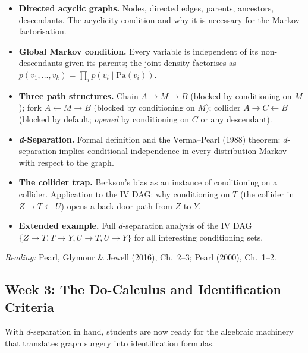 \documentclass[12pt]{article}
\begin{document}
\begin{itemize}
  \item \textbf{Directed acyclic graphs.}
    Nodes, directed edges, parents, ancestors, descendants. The acyclicity
    condition and why it is necessary for the Markov factorisation.

  \item \textbf{Global Markov condition.}
    Every variable is independent of its non-descendants given its parents;
    the joint density factorises as
    $p(v_1,\ldots,v_k) = \prod_i p(v_i \mid \mathrm{Pa}(v_i))$.

  \item \textbf{Three path structures.}
    Chain $A \to M \to B$ (blocked by conditioning on $M$);
    fork $A \leftarrow M \rightarrow B$ (blocked by conditioning on $M$);
    collider $A \to C \leftarrow B$ (blocked by default; \emph{opened} by
    conditioning on $C$ or any descendant).

  \item \textbf{\textit{d}-Separation.}
    Formal definition and the Verma--Pearl (1988) theorem: $d$-separation
    implies conditional independence in every distribution Markov with
    respect to the graph.

  \item \textbf{The collider trap.}
    Berkson's bias as an instance of conditioning on a collider. Application
    to the IV DAG: why conditioning on $T$ (the collider in
    $Z \to T \leftarrow U$) opens a back-door path from $Z$ to $Y$.

  \item \textbf{Extended example.}
    Full $d$-separation analysis of the IV DAG
    $\{Z \to T, T \to Y, U \to T, U \to Y\}$ for all interesting
    conditioning sets.
\end{itemize}

\noindent\textit{Reading:} Pearl, Glymour \& Jewell (2016), Ch.~2--3;
Pearl (2000), Ch.~1--2.

\subsection{Week 3: The Do-Calculus and Identification Criteria}

With $d$-separation in hand, students are now ready for the algebraic
machinery that translates graph surgery into identification formulas.
\end{document}
